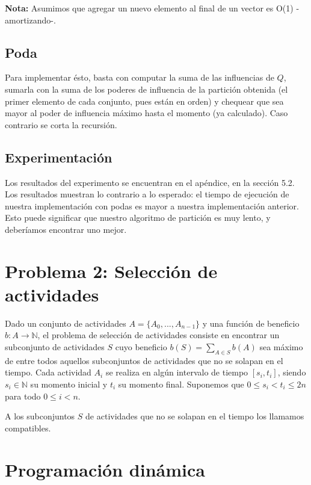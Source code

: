 \documentclass[10pt, a4paper]{article}
\begin{document}
\textbf{Nota:} Asumimos que agregar un nuevo elemento al final de un vector es O(1) -amortizando-.

\subsection{Poda}
Para implementar \'esto, basta con computar la suma de las influencias de $Q$, sumarla con la suma de los poderes de influencia de la partici\'on obtenida (el primer elemento de cada conjunto, pues est\'an en orden) y chequear que sea mayor al poder de influencia m\'aximo hasta el momento (ya calculado). Caso contrario se corta la recursi\'on.\\

\subsection{Experimentaci\'on}

Los resultados del experimento se encuentran en el apéndice, en la sección 5.2. Los resultados muestran lo contrario a lo esperado: el tiempo de ejecución de nuestra implementación con podas es mayor a nuestra implementación anterior. Esto puede significar que nuestro algoritmo de partición es muy lento, y deberíamos encontrar uno mejor.

\section*{Problema 2: Selección de actividades}
Dado un conjunto de actividades $A = \{A_0, ... , A_{n-1}\}$ y una función de beneficio $b: A \rightarrow \mathbb{N}$, el problema de selección de actividades consiste en encontrar un subconjunto de actividades $S$ cuyo beneficio $b(S) = \sum_{A \in S} b(A)$ sea máximo de entre todos aquellos subconjuntos de actividades que no se solapan en el tiempo. Cada actividad $A_i$ se realiza en algún intervalo de tiempo $[ s_i , t_i ]$, siendo $s_i \in \mathbb{N}$ su momento inicial y $t_i$ su momento final. Suponemos que $0 \leq s_i < t_i \leq 2n$ para todo $0 \leq i < n$.

A los subconjuntos $S$ de actividades que no se solapan en el tiempo los llamamos compatibles.

\section{Programación dinámica}
\end{document}
